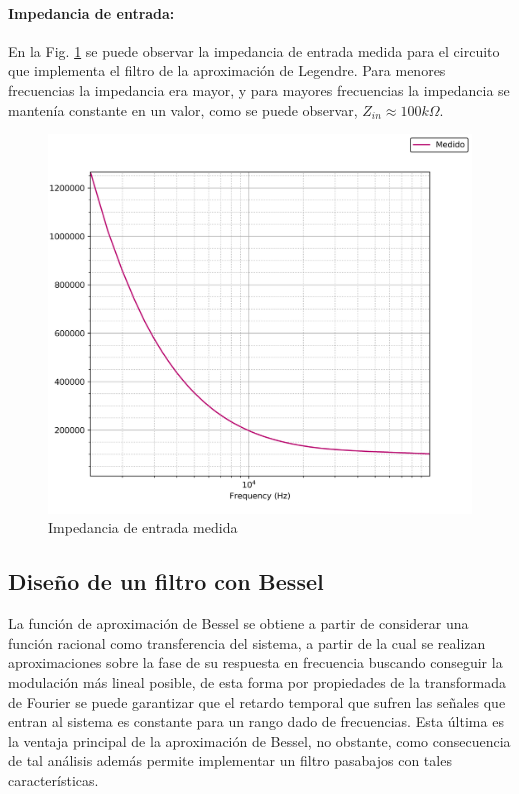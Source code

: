 \paragraph{Impedancia de entrada:} En la Fig. \ref{fig:legendre_impedancia_entrada} se puede observar la impedancia de entrada medida para el circuito que implementa
el filtro de la aproximaci\'on de Legendre. Para menores frecuencias la impedancia era mayor, y para mayores frecuencias la impedancia se manten\'ia constante en un valor,
como se puede observar, $Z_{in} \approx 100k\Omega$.

\begin{figure}[H]
    \centering
    \includegraphics[scale=0.7]{../EJ1/Recursos/legendre_impedancia_entrada.png}
    \caption{Impedancia de entrada medida}
    \label{fig:legendre_impedancia_entrada}
\end{figure}

\subsection{Dise\~no de un filtro con Bessel}
La funci\'on de aproximaci\'on de Bessel se obtiene a partir de considerar una funci\'on racional como transferencia del sistema, a partir de la cual se realizan aproximaciones sobre la fase de su respuesta en frecuencia
buscando conseguir la modulaci\'on m\'as lineal posible, de esta forma por propiedades de la transformada de Fourier se puede garantizar que el retardo temporal que sufren las se\~nales que entran al sistema es constante
para un rango dado de frecuencias. Esta \'ultima es la ventaja principal de la aproximaci\'on de Bessel, no obstante, como consecuencia de tal an\'alisis adem\'as permite implementar un filtro pasabajos con tales caracter\'isticas.

